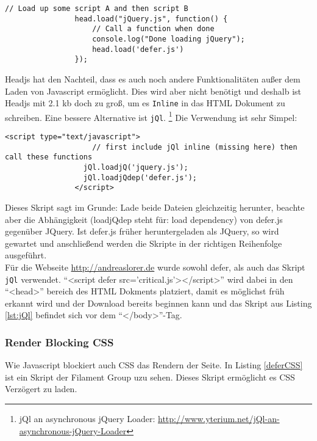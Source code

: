 			\begin{lstlisting}[captionpos=b, caption=Headjs dependency loading (Listing nach http://headjs.com/), label=lst:headjs]
				// Load up some script A and then script B
				head.load("jQuery.js", function() {
				    // Call a function when done
				    console.log("Done loading jQuery");
				    head.load('defer.js')
				});
			\end{lstlisting}

			Headjs hat den Nachteil, dass es auch noch andere Funktionalitäten außer dem Laden von Javascript ermöglicht. Dies wird aber nicht benötigt und deshalb ist Headjs mit 2.1 kb doch zu groß, um es \texttt{Inline} in das HTML Dokument zu schreiben. Eine bessere Alternative ist \texttt{jQl}. \footnote{jQl an asynchronous jQuery Loader: \url{http://www.yterium.net/jQl-an-asynchronous-jQuery-Loader}}
			Die Verwendung ist sehr Simpel:

			\begin{lstlisting}[captionpos=b, caption=jQl asynchronous jQuery-Loader, label=lst:jQl]
				<script type="text/javascript">
					// first include jQl inline (missing here) then call these functions
				  jQl.loadjQ('jquery.js');
				  jQl.loadjQdep('defer.js');
				</script>
			\end{lstlisting}

			Dieses Skript sagt im Grunde: Lade beide Dateien gleichzeitig herunter, beachte aber die Abhängigkeit (loadjQdep steht für: load dependency) von defer.js gegenüber JQuery. Ist defer.js früher heruntergeladen als JQuery, so wird gewartet und anschließend werden die Skripte in der richtigen Reihenfolge ausgeführt.\\

			Für die Webseite \url{http://andreaslorer.de} wurde sowohl defer, als auch das Skript \texttt{jQl} verwendet. "`<script defer src='critical.js'></script>"' wird dabei in den "`<head>"' bereich des HTML Dokments platziert, damit es möglichst früh erkannt wird und der Download bereits beginnen kann und das Skript aus Listing \ref{lst:jQl} befindet sich vor dem "`</body>"'-Tag.

			\pagebreak


		\subsubsection{Render Blocking CSS} %
		\label{ssub:render_blocking_css}
			Wie Javascript blockiert auch CSS das Rendern der Seite. In Listing \ref{deferCSS} ist ein Skript der Filament Group uzu sehen. Dieses Skript ermöglicht es CSS Verzögert zu laden. 

